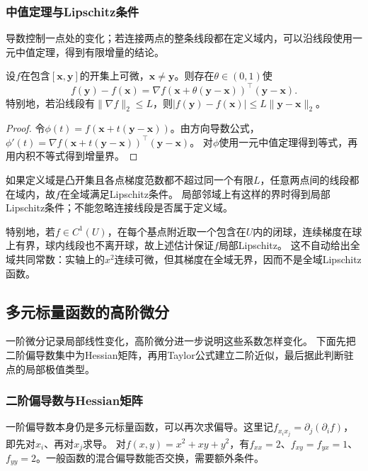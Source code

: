 \subsubsection{中值定理与Lipschitz条件}

导数控制一点处的变化；若连接两点的整条线段都在定义域内，可以沿线段使用一元中值定理，得到有限增量的结论。
\begin{theorem}[多元标量函数的中值公式]
\label{thm:multivariable-scalar-mean-value}
设$f$在包含$[\bm x,\bm y]$的开集上可微，$\bm x\neq\bm y$。则存在$\theta\in(0,1)$使
\[
 f(\bm y)-f(\bm x)=\nabla f(\bm x+\theta(\bm y-\bm x))^\top(\bm y-\bm x).
\]
特别地，若沿线段有$\lVert\nabla f\rVert_2\leq L$，则$|f(\bm y)-f(\bm x)|\leq L\lVert\bm y-\bm x\rVert_2$。
\end{theorem}
\begin{proof}
令$\phi(t)=f(\bm x+t(\bm y-\bm x))$。由方向导数公式，$\phi'(t)=\nabla f(\bm x+t(\bm y-\bm x))^\top(\bm y-\bm x)$。
对$\phi$使用一元中值定理得到等式，再用内积不等式得到增量界。
\end{proof}
如果定义域是凸开集且各点梯度范数都不超过同一个有限$L$，任意两点间的线段都在域内，故$f$在全域满足Lipschitz条件。
局部邻域上有这样的界时得到局部Lipschitz条件；不能忽略连接线段是否属于定义域。

特别地，若$f\in C^1(U)$，在每个基点附近取一个包含在$U$内的闭球，连续梯度在球上有界，球内线段也不离开球，故上述估计保证$f$局部Lipschitz。
这不自动给出全域共同常数：实轴上的$x^2$连续可微，但其梯度在全域无界，因而不是全域Lipschitz函数。

\subsection{多元标量函数的高阶微分}
\label{sec:multivariable-curvature-error}

一阶微分记录局部线性变化，高阶微分进一步说明这些系数怎样变化。
下面先把二阶偏导数集中为Hessian矩阵，再用Taylor公式建立二阶近似，最后据此判断驻点的局部极值类型。

\subsubsection{二阶偏导数与Hessian矩阵}

一阶偏导数本身仍是多元标量函数，可以再次求偏导。这里记$f_{x_i x_j}=\partial_j(\partial_i f)$，即先对$x_i$、再对$x_j$求导。
对$f(x,y)=x^2+xy+y^2$，有$f_{xx}=2$、$f_{xy}=f_{yx}=1$、$f_{yy}=2$。一般函数的混合偏导数能否交换，需要额外条件。

